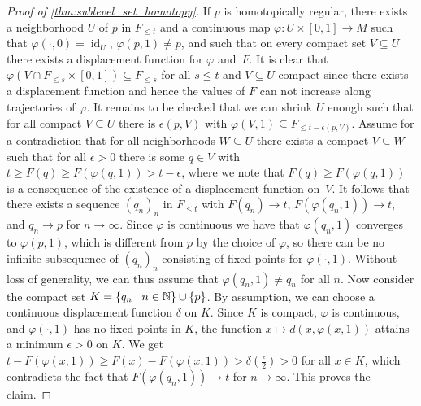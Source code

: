 \begin{proof}[Proof of \cref{thm:sublevel_set_homotopy}]
	If $p$ is homotopically regular, there exists a neighborhood $U$ of $p$ in $F_{\leq t}$ and a continuous map $\varphi \colon U \times [0,1] \to M$ such that $\varphi(\cdot,0) = \operatorname{id}_{U}$, $\varphi(p,1) \neq p$, and such that on every compact set $V \subseteq U$ there exists a displacement function for $\varphi$ and~$F$.
	It is clear that $\varphi(V \cap F_{\leq s} \times [0,1]) \subseteq F_{\leq s}$ for all $s \leq t$ and $V \subseteq U$ compact since there exists a displacement function and hence the values of $F$ can not increase along trajectories of $\varphi$.
	It remains to be checked that we can shrink $U$ enough such that for all compact $V \subseteq U$ there is $\epsilon(p,V)$ with $\varphi(V,1) \subseteq F_{\leq t - \epsilon(p,V)}$.
	Assume for a contradiction that for all neighborhoods $W \subseteq U$ there exists a compact $V \subseteq W$ such that for all $\epsilon > 0$ there is some $q \in V$ with $t \geq F(q) \geq F(\varphi(q,1)) > t - \epsilon$, where we note that $F(q) \geq F(\varphi(q,1))$ is a consequence of the existence of a displacement function on~$V$.
	It follows that there exists a sequence $(q_{n})_{n}$ in $F_{\leq t}$ with $F(q_{n}) \to t$, $F(\varphi(q_{n},1)) \to t$, and $q_{n} \to p$ for $n \to \infty$.
	Since $\varphi$ is continuous we have that $\varphi(q_{n},1)$ converges to $\varphi(p,1)$, which is different from $p$ by the choice of $\varphi$, so there can be no infinite subsequence of $(q_{n})_{n}$ consisting of fixed points for $\varphi(\cdot,1)$.
	Without loss of generality, we can thus assume that $\varphi(q_{n},1) \neq q_{n}$ for all $n$.
	Now consider the compact set $K = \{q_{n} \mid n \in \mathbb{N} \} \cup \{p\}$.
	By assumption, we can choose a continuous displacement function $\delta$ on $K$.
	Since $K$ is compact, $\varphi$ is continuous, %
	and $\varphi(\cdot,1)$ has no fixed points in $K$, the function $x \mapsto %
	d(x,\varphi(x,1))
	$ attains a minimum $\epsilon > 0$ on $K$.
	We get $t - F(\varphi(x,1)) \geq F(x) - F(\varphi(x,1)) > \delta(\frac{\epsilon}{2}) > 0$ for all $x \in K$, which contradicts the fact that $F(\varphi(q_{n},1)) \to t$ for $n \to \infty$.
	This proves the claim.



\end{proof}

